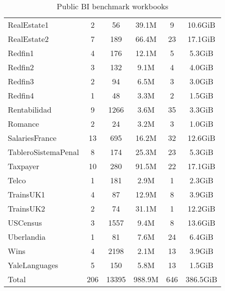 \begin{table}[!h]
\begin{tabular}{@{}l|ccccc@{}}
RealEstate1 & 2 & 56 & 39.1M & 9 & 10.6GiB \\
RealEstate2 & 7 & 189 & 66.4M & 23 & 17.1GiB \\
Redfin1 & 4 & 176 & 12.1M & 5 & 5.3GiB \\
Redfin2 & 3 & 132 & 9.1M & 4 & 4.0GiB \\
Redfin3 & 2 & 94 & 6.5M & 3 & 3.0GiB \\
Redfin4 & 1 & 48 & 3.3M & 2 & 1.5GiB \\
Rentabilidad & 9 & 1266 & 3.6M & 35 & 3.3GiB \\
Romance & 2 & 24 & 3.2M & 3 & 1.0GiB \\
SalariesFrance & 13 & 695 & 16.2M & 32 & 12.6GiB \\
TableroSistemaPenal & 8 & 174 & 25.3M & 23 & 5.3GiB \\
Taxpayer & 10 & 280 & 91.5M & 22 & 17.1GiB \\
Telco & 1 & 181 & 2.9M & 1 & 2.3GiB \\
TrainsUK1 & 4 & 87 & 12.9M & 8 & 3.9GiB \\
TrainsUK2 & 2 & 74 & 31.1M & 1 & 12.2GiB \\
USCensus & 3 & 1557 & 9.4M & 8 & 13.6GiB \\
Uberlandia & 1 & 81 & 7.6M & 24 & 6.4GiB \\
Wins & 4 & 2198 & 2.1M & 13 & 3.9GiB \\
YaleLanguages & 5 & 150 & 5.8M & 13 & 1.5GiB \\ \midrule
Total & 206 & 13395 & 988.9M & 646 & 386.5GiB \\ \bottomrule
\end{tabular}
\caption{Public BI benchmark workbooks}
\label{tab:pbib:workbooks}
\end{table}